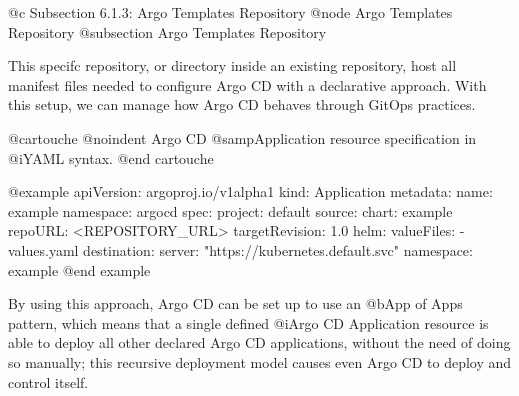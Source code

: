 @c Subsection 6.1.3: Argo Templates Repository
@node Argo Templates Repository
@subsection Argo Templates Repository

This specifc repository, or directory inside an existing repository, host all manifest files needed to configure Argo CD with a declarative approach. With this setup, we can manage how Argo CD behaves through GitOps practices.

@cartouche
@noindent Argo CD @samp{Application} resource specification in @i{YAML} syntax.
@end cartouche

@example
apiVersion: argoproj.io/v1alpha1
kind: Application
metadata:
  name: example
  namespace: argocd
spec:
  project: default
  source:
    chart: example
    repoURL: <REPOSITORY_URL>
    targetRevision: 1.0
    helm:
      valueFiles:
        - values.yaml
  destination:
    server: "https://kubernetes.default.svc"
    namespace: example
@end example

By using this approach, Argo CD can be set up to use an @b{App of Apps} pattern, which means that a single defined @i{Argo CD Application resource} is able to deploy all other declared Argo CD applications, without the need of doing so manually; this recursive deployment model causes even Argo CD to deploy and control itself.
